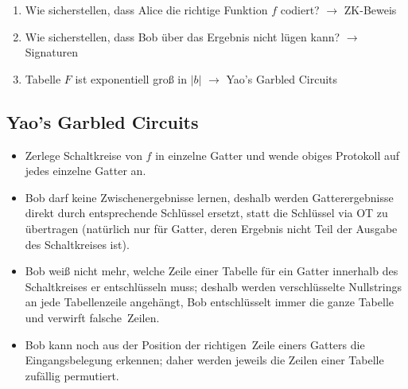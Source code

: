 \documentclass[a4paper,twoside,DIV15,BCOR12mm]{scrbook}
\begin{document}
\begin{enumerate}
	\item Wie sicherstellen, dass Alice die richtige Funktion $f$ codiert? $\rightarrow$ ZK-Beweis
	\item Wie sicherstellen, dass Bob über das Ergebnis nicht lügen kann? $\rightarrow$ Signaturen
	\item Tabelle $F$ ist exponentiell groß in $\left|b\right|$ $\rightarrow$ \glqq Yao's Garbled Circuits\grqq
\end{enumerate}

\subsection{Yao's Garbled Circuits}

\begin{itemize}
	\item Zerlege Schaltkreise von $f$ in einzelne Gatter und wende obiges Protokoll auf jedes einzelne Gatter an.
	\item Bob darf keine Zwischenergebnisse lernen, deshalb werden Gatterergebnisse direkt durch entsprechende Schlüssel ersetzt, statt die Schlüssel via OT zu übertragen (natürlich nur für Gatter, deren Ergebnis nicht Teil der Ausgabe des Schaltkreises ist).
	\item Bob weiß nicht mehr, welche Zeile einer Tabelle für ein Gatter innerhalb des Schaltkreises er entschlüsseln muss; deshalb werden verschlüsselte Nullstrings an jede Tabellenzeile angehängt, Bob entschlüsselt immer die ganze Tabelle und verwirft \glqq falsche\grqq\ Zeilen.
	\item Bob kann noch aus der Position der \glqq richtigen\grqq\ Zeile einers Gatters die Eingangsbelegung erkennen; daher werden jeweils die Zeilen einer Tabelle zufällig permutiert.
\end{itemize}
		

%



%
\end{document}
